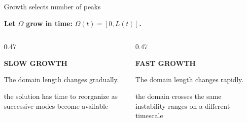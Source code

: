 \begin{frame}{Growth selects number of peaks}

  \vspace{-0.18cm}

  \begin{center}
    {\color{HydraWhite}\bfseries\fontsize{12.4}{15.5}\selectfont
      Let $\Omega$ grow in time: $\Omega(t)=[0,L(t)]$.
    \par}
  \end{center}

  \vspace{0.18cm}

  \begin{columns}[T,onlytextwidth]
    \begin{column}{0.47\textwidth}
      {\centering\color{HydraCyan}\bfseries\fontsize{12}{14.5}\selectfont
        SLOW GROWTH\par}

      \vspace{0.14cm}

      {\centering\color{HydraWhite}\fontsize{10.4}{12.8}\selectfont
        The domain length changes gradually.
      \par}

      \vspace{0.18cm}

      {\centering\color{HydraBody}\fontsize{8.2}{10.3}\selectfont
        the solution has time to reorganize as successive modes become available
      \par}
    \end{column}

    \begin{column}{0.47\textwidth}
      {\centering\color{HydraGold}\bfseries\fontsize{12}{14.5}\selectfont
        FAST GROWTH\par}

      \vspace{0.14cm}

      {\centering\color{HydraWhite}\fontsize{10.4}{12.8}\selectfont
        The domain length changes rapidly.
      \par}

      \vspace{0.18cm}

      {\centering\color{HydraBody}\fontsize{8.2}{10.3}\selectfont
        the domain crosses the same instability ranges on a different timescale
      \par}
    \end{column}
  \end{columns}


\end{frame}
